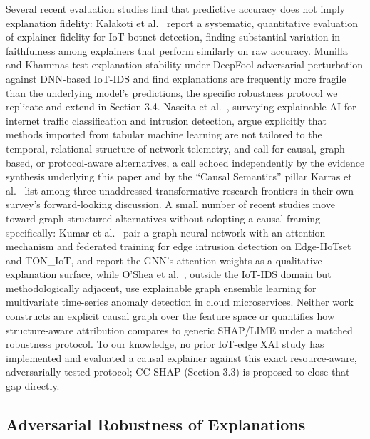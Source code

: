 Several recent evaluation studies find that predictive accuracy does not imply explanation fidelity: Kalakoti et al.~\citep{ref20} report a systematic, quantitative evaluation of explainer fidelity for IoT botnet detection, finding substantial variation in faithfulness among explainers that perform similarly on raw accuracy. Munilla and Khammas \citep{ref8} test explanation stability under DeepFool adversarial perturbation against DNN-based IoT-IDS and find explanations are frequently more fragile than the underlying model's predictions, the specific robustness protocol we replicate and extend in Section 3.4. Nascita et al.~\citep{ref22}, surveying explainable AI for internet traffic classification and intrusion detection, argue explicitly that methods imported from tabular machine learning are not tailored to the temporal, relational structure of network telemetry, and call for causal, graph-based, or protocol-aware alternatives, a call echoed independently by the evidence synthesis underlying this paper \citep{ref7} and by the ``Causal Semantics'' pillar Karras et al.~\citep{ref1} list among three unaddressed transformative research frontiers in their own survey's forward-looking discussion. A small number of recent studies move toward graph-structured alternatives without adopting a causal framing specifically: Kumar et al.~\citep{ref30} pair a graph neural network with an attention mechanism and federated training for edge intrusion detection on Edge-IIoTset and TON\_IoT, and report the GNN's attention weights as a qualitative explanation surface, while O'Shea et al.~\citep{ref31}, outside the IoT-IDS domain but methodologically adjacent, use explainable graph ensemble learning for multivariate time-series anomaly detection in cloud microservices. Neither work constructs an explicit causal graph over the feature space or quantifies how structure-aware attribution compares to generic SHAP/LIME under a matched robustness protocol. To our knowledge, no prior IoT-edge XAI study has implemented and evaluated a causal explainer against this exact resource-aware, adversarially-tested protocol; CC-SHAP (Section 3.3) is proposed to close that gap directly.

\subsection{Adversarial Robustness of Explanations}\label{adversarial-robustness-of-explanations}

